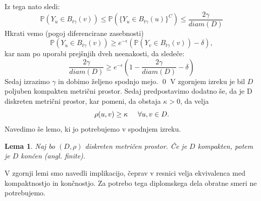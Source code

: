\documentclass[12pt,a4paper]{amsart}
\theoremstyle{definition} %
\theoremstyle{plain} %
\newtheorem{lema}[definicija]{Lema}
\begin{document}
Iz tega nato sledi: $$\mathbb{P}(Y_u \in B_{t\gamma}(v)) \leq \mathbb{P}(\{Y_u \in B_{t\gamma}(u)\}^C) \leq \frac{2\gamma}{diam(D)}$$ Hkrati vemo (pogoj diferencirane zasebnosti) $$\mathbb{P}(Y_u \in B_{t\gamma}(v)) \geq e^{-\epsilon}(\mathbb{P}(Y_v \in B_{t\gamma}(v)) - \delta),$$ kar nam po uporabi prejšnjih dveh neenakosti, da sledeče: $$\frac{2\gamma}{diam(D)} \geq e^{-\epsilon}(1 - \frac{2\gamma}{diam(D)} - \delta) $$ Sedaj izrazimo $\gamma$ in dobimo željeno spodnjo mejo.
\qed
\newline
\newline
V zgornjem izreku je bil $D$ poljuben kompakten metrični prostor. Sedaj predpostavimo dodatno še, da je D diskreten metrični prostor, kar pomeni, da obstaja $\kappa > 0$, da velja $$\rho(u,v) \geq \kappa \hspace{0.5cm}  \forall u, v \in D.$$ Navedimo še lemo, ki jo potrebujemo v spodnjem izreku. 
\begin{lema}
 Naj bo $(D, \rho)$ diskreten metričen prostor. Če je $D$ kompakten, potem je $D$ končen (angl. finite). 
\end{lema}
V zgornji lemi smo navedli implikacijo, čeprav v resnici velja ekvivalenca med kompaktnostjo in končnostjo. Za potrebo tega diplomskega dela obratne smeri ne potrebujemo.
\end{document}
